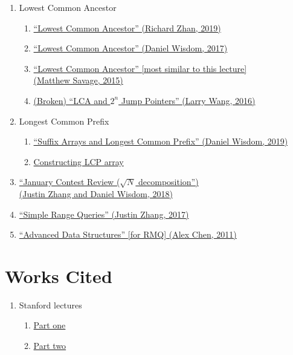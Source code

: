 \documentclass[11pt, oneside]{article}
\begin{document}
\begin{enumerate}
  \item Lowest Common Ancestor
    \begin{enumerate}
       \item \href{https://activities.tjhsst.edu/sct/lectures/1920/2019_10_25_LCA.pdf}{``Lowest Common Ancestor'' (Richard Zhan, 2019)}
       \item \href{https://activities.tjhsst.edu/sct/lectures/1718/2017-12-01_Lowest_Common_Ancestor.pdf}{``Lowest Common Ancestor'' (Daniel Wisdom, 2017)}
       \item \href{https://activities.tjhsst.edu/sct/lectures/1415/SCT_Lowest_Common_Ancestor.pdf}{``Lowest Common Ancestor'' [most similar to this lecture] \\ (Matthew Savage, 2015)}
       \item \href{https://activities.tjhsst.edu/sct/lectures/1617/2016-10-21_LCA_and_2_n_Jump_Pointers.pdf}{(Broken) ``LCA and \( 2^n \) Jump Pointers'' (Larry Wang, 2016)}
    \end{enumerate}
  \item Longest Common Prefix
    \begin{enumerate}
      \item \href{https://activities.tjhsst.edu/sct/lectures/1819/2019_03_29_Suffix_Arrays_and_LCP.pdf}{``Suffix Arrays and Longest Common Prefix'' (Daniel Wisdom, 2019)}
      \item \href{http://web.stanford.edu/class/cs166/lectures/03/Slides03.pdf}{Constructing LCP array}
    \end{enumerate}
  \item \href{https://activities.tjhsst.edu/sct/lectures/1718/2018-02-09_USACO_Gold_Plat_January_Contest_Review_(square-root_decomposition).pdf}
  {``January Contest Review (\( \sqrt{N} \) decomposition'') \\ (Justin Zhang and Daniel Wisdom, 2018)}
  \item \href{https://activities.tjhsst.edu/sct/lectures/1718/2017-10-06_Simple_Range_Queries.pdf}{``Simple Range Queries'' (Justin Zhang, 2017)}
  \item \href{https://activities.tjhsst.edu/sct/lectures/1112/rquery102811.pdf}{``Advanced Data Structures'' [for RMQ] (Alex Chen, 2011)}
\end{enumerate}

\section{Works Cited}

\begin{enumerate}
  \item Stanford lectures
    \begin{enumerate}
      \item \href{http://web.stanford.edu/class/cs166/lectures/00/Slides00.pdf}{Part one}
      \item \href{http://web.stanford.edu/class/cs166/lectures/01/Slides01.pdf}{Part two}
    \end{enumerate}
\end{enumerate}
\end{document}
